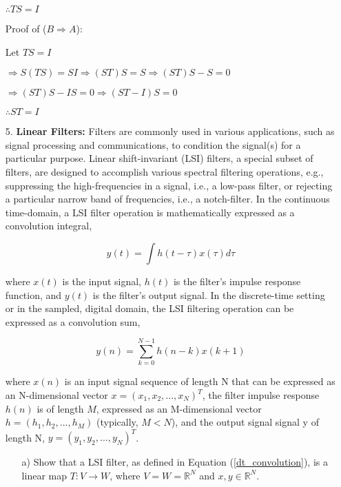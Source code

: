 \documentclass[fleqn]{article}
\begin{document}
\begin{enumerate}[nolistsep]
			$\therefore TS = I$
			
			Proof of ($B \Rightarrow A$):
			
			Let $TS = I$
			
			$\Rightarrow S(TS) = SI \Rightarrow (ST)S = S \Rightarrow (ST)S - S = 0$
			
			$\Rightarrow (ST)S - IS = 0 \Rightarrow (ST - I)S = 0$
			
			$\therefore ST = I$
	
		\item[5.] \textbf{Linear Filters:} Filters are commonly used in various applications, such as signal processing and communications, to condition the signal(s) for a particular purpose. Linear shift-invariant (LSI) filters, a special subset of filters, are designed to accomplish various spectral filtering operations, e.g., suppressing the high-frequencies in a signal, i.e., a low-pass filter, or rejecting a particular narrow band of frequencies, i.e., a notch-filter. In the continuous time-domain, a LSI filter operation is mathematically expressed as a convolution integral,
	
			\begin{equation}
				y(t) = \int{h(t-\tau)x(\tau)d\tau}
			\end{equation}
		
			where $x(t)$ is the input signal, $h(t)$ is the filter’s impulse response function, and $y(t)$ is the filter’s output signal. In the discrete-time setting or in the sampled, digital domain, the LSI filtering operation can be expressed as a convolution sum,
	
			\begin{equation}
				y(n) = \sum_{k=0}^{N-1}{h(n-k)x(k+1)}
				\label{dt_convolution}
			\end{equation}
	
			\pagebreak
			where $x(n)$ is an input signal sequence of length N that can be expressed as an N-dimensional vector $x = (x_1, x_2, ..., x_N)^T$, the filter impulse response $h(n)$ is of length $M$, expressed as an M-dimensional vector $h = (h_1, h_2, ..., h_M)$ (typically, $M < N$), and the output signal signal y of length N, $y = (y_1, y_2, ..., y_N)^T$.
		
			\begin{enumerate}
				\item[a)] Show that a LSI filter, as defined in Equation (\ref{dt_convolution}), is a linear map $T : V \rightarrow W$, where $V = W = \mathbb{R}^N$ and $x,y \in \mathbb{R}^N$.
			

\end{enumerate}
\end{enumerate}
\end{document}
